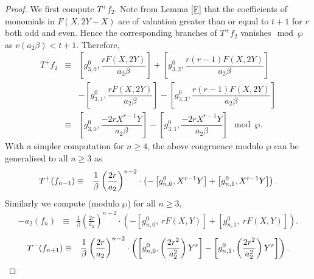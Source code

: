 \documentclass[11pt, reqno]{amsart}
\numberwithin{equation}{section}
\theoremstyle{definition}
\theoremstyle{remark}
\theoremstyle{definition}
\theoremstyle{remark}
\theoremstyle{remark}
\begin{document}
\begin{proof}
We first compute $T^+f_{2}$. Note from Lemma \ref{F} that the coefficients of monomials in $F(X,2Y-X)$ are of valuation greater than or equal to $t+1$ for $r$ both odd and even. Hence the corresponding branches of $T^{+}f_2$ vanishes$\mod \wp$ as $v(a_2\beta)< t+1$. Therefore, %
\begin{eqnarray}
    T^+f_{2} &\equiv& \left[g_{3,0}^{0}, \dfrac{rF(X,2Y)}{a_{2}\beta}\right] + \left[g_{3,2}^{0}, \dfrac{r(r-1)F(X,2Y)}{a_{2}\beta}\right]\nonumber \\
    && -\left[g_{3,1}^{0}, \dfrac{rF(X,2Y)}{a_{2}\beta}\right] - \left[g_{3,3}^{0}, \dfrac{r(r-1)F(X,2Y)}{a_{2}\beta}\right]\nonumber\\
    &\equiv& \left[g_{3,0}^{0}, \dfrac{-2rX^{r-1}Y}{a_{2}\beta}\right] - \left[g_{3,1}^{0}, \dfrac{-2rX^{r-1}Y}{a_{2}\beta}\right] \mod \wp.\label{T^+f_2}
\end{eqnarray}
With a simpler computation for $n\geq 4$, the above congruence modulo $\wp$ can be generalised  to all $n\geq 3$ as
\begin{eqnarray}\label{T^+f_{n-1}}
T^{+}(f_{n-1}) &\equiv& \frac{1}{\beta}\left(\dfrac{2r}{a_{2}}\right)^{n-2}\cdot\left(-\left[g_{n,0}^{0}, X^{r-1}Y\right] + \left[g_{n,1}^{0}, X^{r-1}Y\right]\right).
\end{eqnarray}
Similarly we compute (modulo $\wp$) for all $n\geq 3$,
\begin{eqnarray}\label{a_2f_n}
 -a_{2}(f_{n}) &\equiv& \frac{1}{\beta}\left(\frac{2r}{a_{2}}\right)^{n-2}\cdot\left(-\left[g_{n,0}^{0},\: rF(X,Y)\right] + \left[g_{n,1}^{0},\: rF(X,Y)\right]\right) .  
\end{eqnarray}
\begin{eqnarray}\label{T^-f_{n+1}}
T^{-}(f_{n+1}) &\equiv& \frac{1}{\beta}\left(\frac{2r}{a_{2}}\right)^{n-2}\cdot\left(\left[g_{n,0}^0, \left(\frac{2r^2}{a_{2}^2}\right)Y^r \right] - \left[g_{n,1}^0, \left(\frac{2r^2}{a_{2}^2}\right)Y^r \right]\right).
\end{eqnarray}


\end{proof}
\end{document}
